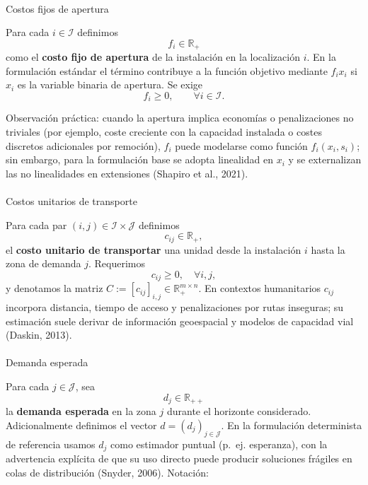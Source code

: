 \documentclass[
  spanish,
  letterpaper,
  DIV=11,
  numbers=noendperiod]{scrartcl}
\makeatletter
\let\oldparagraph\paragraph
\renewcommand{\paragraph}{
    \@ifstar
      \xxxParagraphStar
      \xxxParagraphNoStar
  }
\newcommand{\xxxParagraphStar}[1]{\oldparagraph*{#1}\mbox{}}
\newcommand{\xxxParagraphNoStar}[1]{\oldparagraph{#1}\mbox{}}
\makeatother
\begin{document}
\paragraph{Costos fijos de apertura}\label{costos-fijos-de-apertura}

Para cada \(i\in\mathcal{I}\) definimos \[
f_i \in \mathbb{R}_{+}
\] como el \textbf{costo fijo de apertura} de la instalación en la
localización \(i\). En la formulación estándar el término contribuye a
la función objetivo mediante \(f_i x_i\) si \(x_i\) es la variable
binaria de apertura. Se exige \[
f_i \ge 0,\qquad \forall i\in\mathcal{I}.
\]

Observación práctica: cuando la apertura implica economías o
penalizaciones no triviales (por ejemplo, coste creciente con la
capacidad instalada o costes discretos adicionales por remoción),
\(f_i\) puede modelarse como función \(f_i(x_i,s_i)\); sin embargo, para
la formulación base se adopta linealidad en \(x_i\) y se externalizan
las no linealidades en extensiones (Shapiro et al., 2021).

\paragraph{Costos unitarios de
transporte}\label{costos-unitarios-de-transporte}

Para cada par \((i,j)\in\mathcal{I}\times\mathcal{J}\) definimos \[
c_{ij}\in\mathbb{R}_{+},
\] el \textbf{costo unitario de transportar} una unidad desde la
instalación \(i\) hasta la zona de demanda \(j\). Requerimos \[
c_{ij}\ge 0,\quad \forall i,j,
\] y denotamos la matriz
\(C:=[c_{ij}]_{i,j}\in\mathbb{R}_+^{m\times n}\). En contextos
humanitarios \(c_{ij}\) incorpora distancia, tiempo de acceso y
penalizaciones por rutas inseguras; su estimación suele derivar de
información geoespacial y modelos de capacidad vial (Daskin, 2013).

\paragraph{Demanda esperada}\label{demanda-esperada}

Para cada \(j\in\mathcal{J}\), sea \[
d_j\in\mathbb{R}_{++}
\] la \textbf{demanda esperada} en la zona \(j\) durante el horizonte
considerado. Adicionalmente definimos el vector
\(d=(d_j)_{j\in\mathcal{J}}\). En la formulación determinista de
referencia usamos \(d_j\) como estimador puntual (p.~ej. esperanza), con
la advertencia explícita de que su uso directo puede producir soluciones
frágiles en colas de distribución (Snyder, 2006). Notación:
\end{document}
